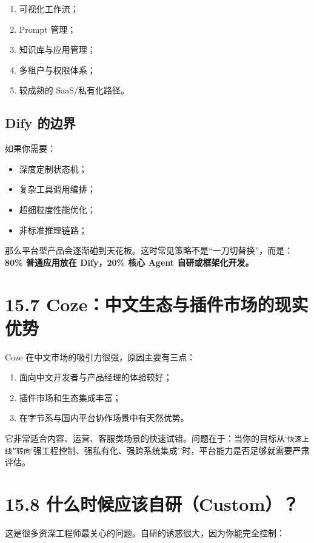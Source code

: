 \begin{enumerate}[leftmargin=2em]
\item 可视化工作流；
\item Prompt 管理；
\item 知识库与应用管理；
\item 多租户与权限体系；
\item 较成熟的 SaaS/私有化路径。
\end{enumerate}

\subsection{Dify 的边界}

如果你需要：


\begin{itemize}[leftmargin=2em]
\item 深度定制状态机；
\item 复杂工具调用编排；
\item 超细粒度性能优化；
\item 非标准推理链路；
\end{itemize}

那么平台型产品会逐渐碰到天花板。这时常见策略不是``一刀切替换''，而是：\textbf{80\% 普通应用放在 Dify，20\% 核心 Agent 自研或框架化开发。}


\section{15.7 Coze：中文生态与插件市场的现实优势}

Coze 在中文市场的吸引力很强，原因主要有三点：


\begin{enumerate}[leftmargin=2em]
\item 面向中文开发者与产品经理的体验较好；
\item 插件市场和生态集成丰富；
\item 在字节系与国内平台协作场景中有天然优势。
\end{enumerate}

它非常适合内容、运营、客服类场景的快速试错。问题在于：当你的目标从`\texttt{快速上线''转向}`强工程控制、强私有化、强跨系统集成''时，平台能力是否足够就需要严肃评估。


\section{15.8 什么时候应该自研（Custom）？}

这是很多资深工程师最关心的问题。自研的诱惑很大，因为你能完全控制：


